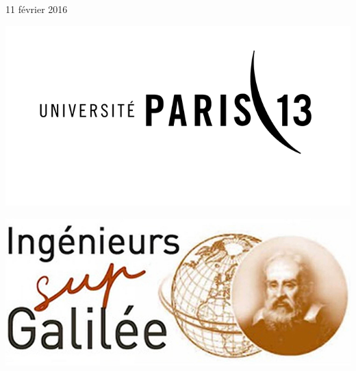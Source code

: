\begin{titlepage}
\begin{center}
	   \vfill			
	       {\large 11 février 2016}
	       \vfill
	       \begin{minipage}{0.35\textwidth}
		 \begin{flushleft}
		   \includegraphics[width=1\textwidth]{../img/UP13.png}			
		 \end{flushleft}
	       \end{minipage}
	       \hfill
	       \begin{minipage}{0.35\textwidth}
		 \begin{flushright}
		   \includegraphics[width=1\textwidth]{../img/sup-galile.png}
		 \end{flushright}
	       \end{minipage}
	       
	       
  \end{center}		
\end{titlepage}
